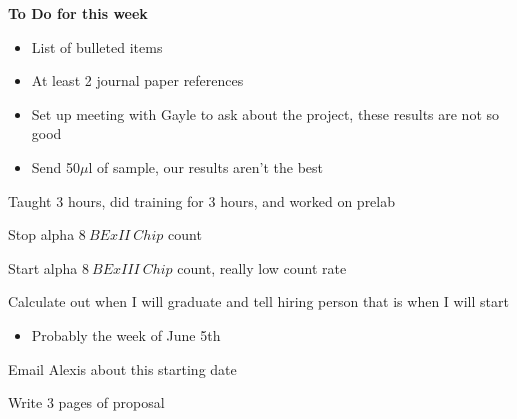 \documentclass[idxtotoc,hyperref,openany,oneside]{labbook} %
\newcommand{\cmark}{\ding{51}}%
\newcommand{\done}{\rlap{$\square$}{\raisebox{2pt}{\large\hspace{1pt}\cmark}}%
  \hspace{-2.5pt}}
\begin{document}
\textbf{To Do for this week}
\begin{itemize}
\item{List of bulleted items}
\item{At least 2 journal paper references}
\item{Set up meeting with Gayle to ask about the project, these results are not so good}
\item{Send 50$\mu$l of sample, our results aren't the best}
\end{itemize}








Taught 3 hours, did training for 3 hours, and worked on prelab


\begin{todolist}
\item[\done]{Stop alpha $\boxed{8\ BExII\ Chip}$ count}
\item[\done]{Start alpha $\boxed{8\ BExIII\ Chip}$ count, really low count rate}
\end{todolist}


\begin{todolist}
\item[\done]{Calculate out when I will graduate and tell hiring person that is when
  I will start}
  \begin{itemize}
  \item{Probably the week of June 5th}
  \end{itemize}
\item[\done]{Email Alexis about this starting date}
\item{Write 3 pages of proposal}
\end{todolist}





\end{document}
